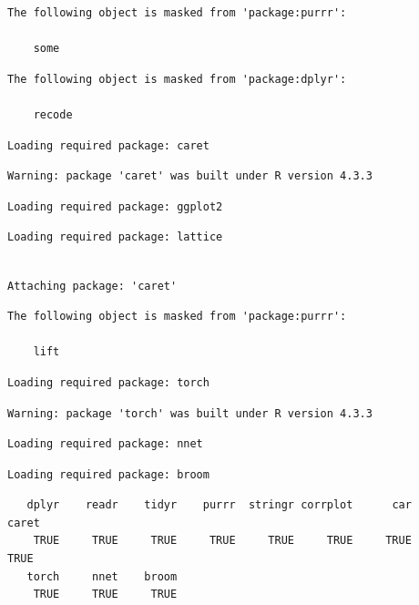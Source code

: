 \documentclass[
  letterpaper,
  DIV=11,
  numbers=noendperiod]{scrartcl}
\begin{document}
\begin{verbatim}
The following object is masked from 'package:purrr':

    some
\end{verbatim}

\begin{verbatim}
The following object is masked from 'package:dplyr':

    recode
\end{verbatim}

\begin{verbatim}
Loading required package: caret
\end{verbatim}

\begin{verbatim}
Warning: package 'caret' was built under R version 4.3.3
\end{verbatim}

\begin{verbatim}
Loading required package: ggplot2
\end{verbatim}

\begin{verbatim}
Loading required package: lattice
\end{verbatim}

\begin{verbatim}

Attaching package: 'caret'
\end{verbatim}

\begin{verbatim}
The following object is masked from 'package:purrr':

    lift
\end{verbatim}

\begin{verbatim}
Loading required package: torch
\end{verbatim}

\begin{verbatim}
Warning: package 'torch' was built under R version 4.3.3
\end{verbatim}

\begin{verbatim}
Loading required package: nnet
\end{verbatim}

\begin{verbatim}
Loading required package: broom
\end{verbatim}

\begin{verbatim}
   dplyr    readr    tidyr    purrr  stringr corrplot      car    caret 
    TRUE     TRUE     TRUE     TRUE     TRUE     TRUE     TRUE     TRUE 
   torch     nnet    broom 
    TRUE     TRUE     TRUE 
\end{verbatim}
\end{document}
